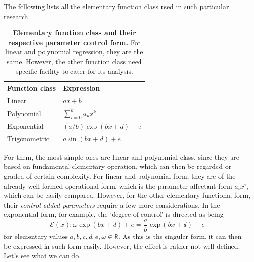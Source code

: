 \documentclass{article}
\begin{document}
The following lists all the elementary function class used in such particular research. 

\begin{table}[htb]
  \centering
  \begin{tabular}{p{2cm}p{3cm}} 
    \hline 
    Function class & Expression\\
    \hline
    Linear & $ax + b$ \\
    Polynomial & $\sum_{i=0}^{k} a_{k}x^{k}$ \\
    Exponential & $ (a/b) \exp{(bx+d)}+e$ \\
    Trigonometric & $a\sin{(bx+d)}+e$ \\
  \end{tabular}
  \caption{
    \textbf{Elementary function class and their respective parameter control form.} For linear and polynomial regression, they are the same. However, the other function class need specific facility to cater for its analysis.  
  }
\end{table}

For them, the most simple ones are linear and polynomial class, since they are based on fundamental elementary operation, which can then be regarded or graded of certain complexity. For linear and polynomial form, they are of the already well-formed operational form, which is the parameter-affectant form $a_{i}x^{i}$, which can be easily compared. However, for the other elementary functional form, their \textit{control-added parameters} require a few more considerations. In the exponential form, for example, the `degree of control' is directed as being 
\begin{equation}
  \mathcal{E}(x) : \omega \exp{(bx+d)}+ e = \frac{a}{b} \exp{(bx + d)} + e 
\end{equation}
for elementary values $a,b,c,d,e,\omega \in \mathbb{R}$. As this is the singular form, it can then be expressed in such form easily. However, the effect is rather not well-defined. Let's see what we can do. 
\end{document}
